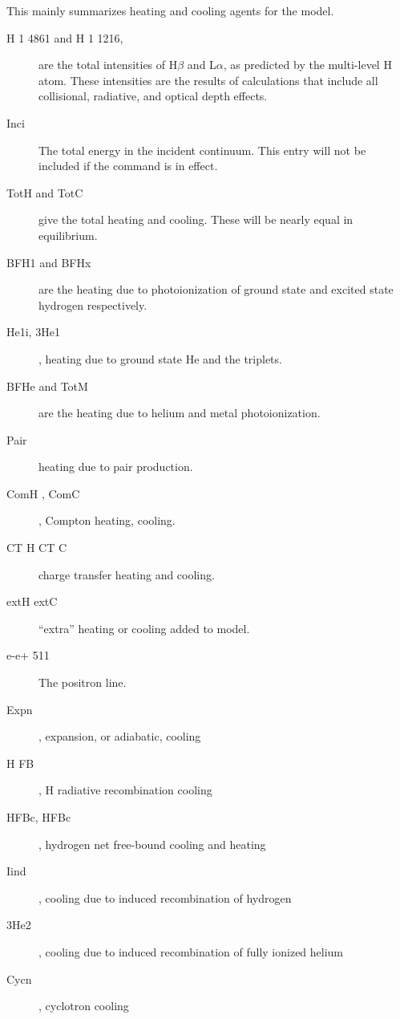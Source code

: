 This mainly summarizes heating and cooling agents for the model.
\begin{description}
\item[H  1 4861 and H  1 1216,] are the total intensities of H$\beta$
and L$\alpha $, as
predicted by the multi-level H atom.
These intensities are the results
of calculations that include all collisional, radiative, and optical
depth effects.

\item[Inci]  The total energy in the incident continuum.
This entry will not be included if the  command is in effect.

\item[TotH and TotC] give the total heating and cooling.  These will be nearly
equal in equilibrium.

\item[BFH1 and BFHx] are the heating due to photoionization of ground state
and excited state hydrogen respectively.

\item[He1i, 3He1], heating due to ground state He and the triplets.

\item[BFHe and TotM] are the heating due to helium and metal photoionization.

\item[Pair] heating due to pair production.

\item[ComH , ComC],  Compton heating, cooling.

\item[CT H    CT C] charge transfer heating and cooling.

\item[extH   extC]    ``extra'' heating or cooling added to model.

\item[e-e+  511]  The positron line.

\item[Expn], expansion, or adiabatic, cooling

\item[H FB], H radiative recombination cooling

\item[HFBc, HFBc], hydrogen net free-bound cooling and heating

\item[Iind], cooling due to induced recombination of hydrogen

\item[3He2], cooling due to induced recombination of fully ionized helium

\item[Cycn], cyclotron cooling
\end{description}

